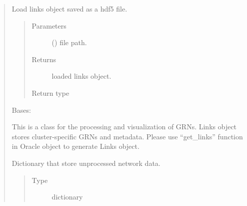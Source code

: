 \documentclass[letterpaper,10pt,english]{sphinxmanual}
\begin{document}
\begin{quote}
\begin{fulllineitems}
\end{fulllineitems}


\begin{fulllineitems}
\label{\detokenize{modules/celloracle.network_analysis:celloracle.network_analysis.load_links}}
Load links object saved as a hdf5 file.
\begin{quote}\begin{description}
\item[{Parameters}] \leavevmode
{} () \textendash{} file path.

\item[{Returns}] \leavevmode
loaded links object.

\item[{Return type}] \leavevmode
{\hyperref[\detokenize{modules/celloracle:celloracle.Links}]{}}

\end{description}\end{quote}

\end{fulllineitems}


\begin{fulllineitems}
\label{\detokenize{modules/celloracle.network_analysis:celloracle.network_analysis.Links}}
Bases: 

This is a class for the processing and visualization of GRNs.
Links object stores cluster-specific GRNs and metadata.
Please use “get\_links” function in Oracle object to generate Links object.

\begin{fulllineitems}
\label{\detokenize{modules/celloracle.network_analysis:celloracle.network_analysis.Links.links_dict}}
Dictionary that store unprocessed network data.
\begin{quote}\begin{description}
\item[{Type}] \leavevmode
dictionary


\end{description}
\end{quote}
\end{fulllineitems}
\end{fulllineitems}
\end{quote}
\end{document}
